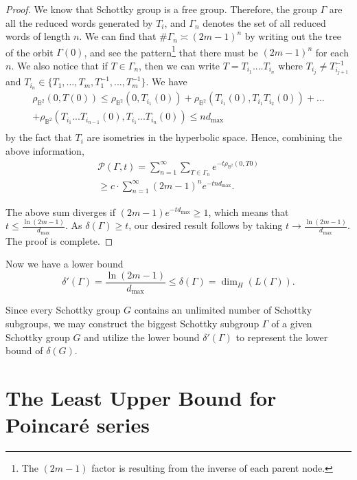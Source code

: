 \documentclass[12pt,oneside]{sfsuthesis}
\theoremstyle{plain} %
\theoremstyle{definition}  %
\theoremstyle{remark}  %
\theoremstyle{plain}
\begin{document}
{\begin{proof}
We know that Schottky group is a free group. Therefore, the group $\Gamma$ are all the reduced words generated by $T_i$, and $\Gamma_n$ denotes the set of all reduced words of length $n$. We can find that $\#\Gamma_n\asymp (2m-1)^n$ by writing out the tree of the orbit $\Gamma(0)$, and see the pattern\footnote{The $(2m-1)$ factor is resulting from the inverse of each parent node.} that there must be $(2m-1)^n$ for each $n$. We also notice that if $T\in \Gamma_n$, then we can write $T = T_{i_1}....T_{i_n}$ where $T_{i_j}\ne T_{i_{j+1}}^{-1}$ and $T_{i_n}\in \{T_1,...,T_m, T_1^{-1},...,T_m^{-1}\}$. We have 
\begin{equation}
\begin{array}{c}
\rho_{\mathbb{B}^2}(0,T(0)) \leq  \rho_{\mathbb{B}^2}(0,T_{i_1}(0))+
 \rho_{\mathbb{B}^2}(T_{i_1}(0), T_{i_1}T_{i_2}(0))+...\\+\rho_{\mathbb{B}^2}(T_{i_1}...T_{i_{n-1}}(0), T_{i_1}...T_{i_n}(0))   \le  n d_{\max}\\
\end{array}
\end{equation}
by the fact that $T_i$ are isometries in the hyperbolic space.  Hence, combining the above information, 
\begin{equation}
\begin{array}{c}
\mathcal{P}(\Gamma,  t) = \sum\limits_{n=1}^{\infty}\sum\limits_{T\in \Gamma_n} e^{-t \rho_{\mathbb{B}^2}(0,T0)}\\
\ge  c\cdot   \sum\limits_{n=1}^{\infty}  (2m-1)^n e^{-tn d_{\max}}. 
\end{array}
\end{equation}

The above sum diverges if $(2m-1)e^{-td_{\max}}\ge 1$, which means that $t \le \frac{\ln (2m-1)}{d_{\max}}$. As $\delta(\Gamma) \ge t$, our desired result follows by taking $t\to \frac{\ln (2m-1)}{d_{\max}}$. The proof is complete. 
\end{proof}


Now we have a lower bound $$\delta'(\Gamma)=\frac{\ln (2m-1)}{d_{\max}}\leq \delta(\Gamma)=\dim_{H}(L(\Gamma)).$$

Since every Schottky group $G$ contains an unlimited number of Schottky subgroups, we may construct the biggest Schottky subgroup $\Gamma$ of a given Schottky group $G$ and utilize the lower bound $\delta'(\Gamma)$ to represent the lower bound of $\delta(G)$.


\section{The Least Upper Bound for Poincar\'{e} series}

}
\end{document}
